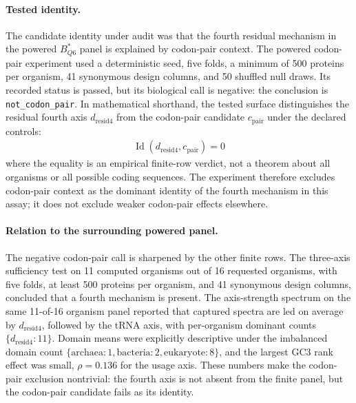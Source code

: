 \paragraph{Tested identity.}
The candidate identity under audit was that the fourth residual mechanism in the powered $B^{*}_{Q6}$ panel is explained by codon-pair context. The powered codon-pair experiment used a deterministic seed, five folds, a minimum of 500 proteins per organism, 41 synonymous design columns, and 50 shuffled null draws. Its recorded status is passed, but its biological call is negative: the conclusion is \texttt{not\_codon\_pair}. In mathematical shorthand, the tested surface distinguishes the residual fourth axis $d_{\mathrm{resid4}}$ from the codon-pair candidate $c_{\mathrm{pair}}$ under the declared controls:
$$
\begin{aligned}
\operatorname{Id}(d_{\mathrm{resid4}},c_{\mathrm{pair}}) = 0
\end{aligned}
$$
where the equality is an empirical finite-row verdict, not a theorem about all organisms or all possible coding sequences. The experiment therefore excludes codon-pair context as the dominant identity of the fourth mechanism in this assay; it does not exclude weaker codon-pair effects elsewhere.

\paragraph{Relation to the surrounding powered panel.}
The negative codon-pair call is sharpened by the other finite rows. The three-axis sufficiency test on 11 computed organisms out of 16 requested organisms, with five folds, at least 500 proteins per organism, and 41 synonymous design columns, concluded that a fourth mechanism is present. The axis-strength spectrum on the same 11-of-16 organism panel reported that captured spectra are led on average by $d_{\mathrm{resid4}}$, followed by the tRNA axis, with per-organism dominant counts $\{d_{\mathrm{resid4}}:11\}$. Domain means were explicitly descriptive under the imbalanced domain count $\{\mathrm{archaea}:1,\mathrm{bacteria}:2,\mathrm{eukaryote}:8\}$, and the largest GC3 rank effect was small, $\rho=0.136$ for the usage axis. These numbers make the codon-pair exclusion nontrivial: the fourth axis is not absent from the finite panel, but the codon-pair candidate fails as its identity.

